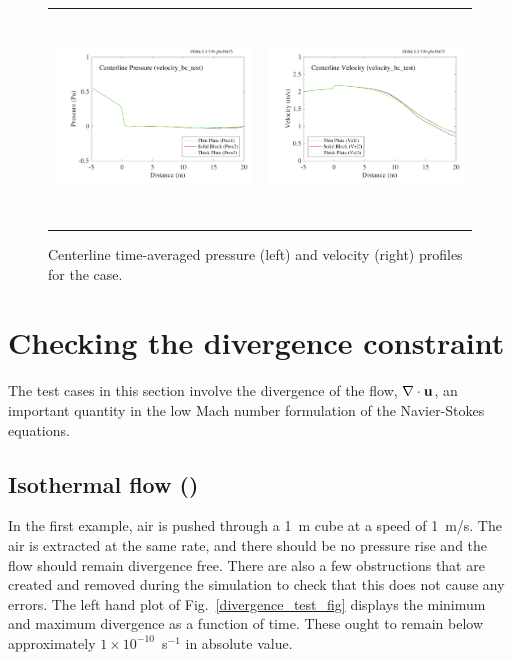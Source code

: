 \documentclass[11pt]{book}
\begin{document}
\begin{figure}[!ht]
\begin{tabular*}{\textwidth}{lr}
\includegraphics[height=2.2in]{SCRIPT_FIGURES/velocity_bc_test_pres} &
\includegraphics[height=2.2in]{SCRIPT_FIGURES/velocity_bc_test_vel}
\end{tabular*}
\caption[The  test case]{Centerline time-averaged pressure (left) and velocity (right) profiles for the  case.}
\label{velocity_bc_test_plot}
\end{figure}


\newpage

\section{Checking the divergence constraint}
\label{divergence_test}

The test cases in this section involve the divergence of the flow, $\nabla \cdot {\mathbf{u}}$, an important quantity in the low Mach number formulation of the Navier-Stokes equations.

\subsection{Isothermal flow (\texorpdfstring{}{divergence\_test\_1})}
\label{divergence_test_1}

In the first example, air is pushed through a 1~m cube at a speed of 1~m/s. The air is extracted at the same rate, and there should be no pressure rise and the flow should remain divergence free. There are also a few obstructions that are created and removed during the simulation to check that this does not cause any errors. The left hand plot of Fig.~\ref{divergence_test_fig} displays the minimum and maximum divergence as a function of time. These ought to remain below approximately $1 \times 10^{-10}$~s$^{-1}$ in absolute value.
\end{document}
